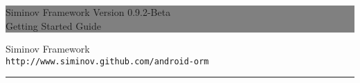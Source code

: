 \documentclass[12pt]{report}
\newcommand{\HRule}[1]{\hfill \rule{0.2\linewidth}{#1}} %
\begin{document}
\thispagestyle{empty} %


\colorbox{grey}{
	\parbox[t]{1.0\linewidth}{
		\centering \fontsize{50pt}{80pt}\selectfont %
		\vspace*{0.7cm} %
		
		\hfill Siminov Framework Version 0.9.2-Beta\\
		\hfill Getting Started Guide\par
		
		\vspace*{0.7cm} %
	}
}


	\vfill %


	{\centering \large 
\hfill Siminov Framework\\
\hfill \texttt{http://www.siminov.github.com/android-orm} \\

\HRule{1pt}} %


\clearpage %


\noindent
\setcounter{secnumdepth}{3}
\setcounter{tocdepth}{3}


\tableofcontents






\end{document}

